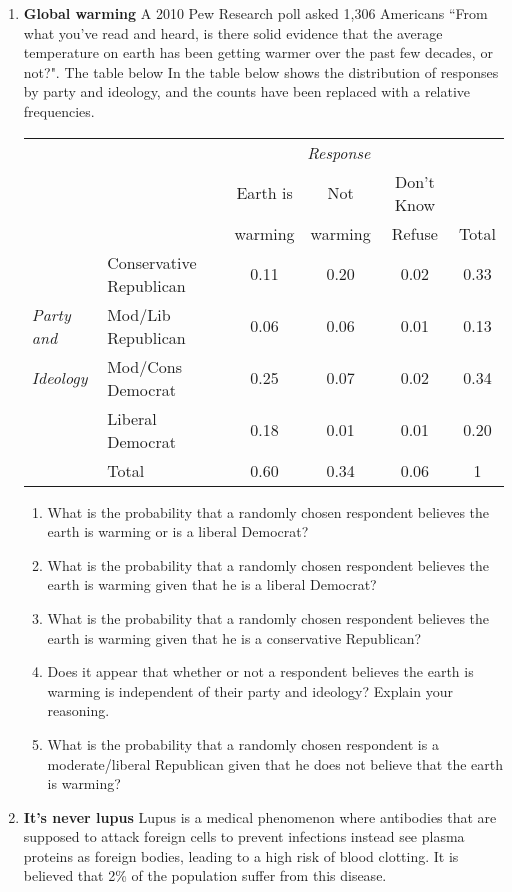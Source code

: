 \documentclass[10pt]{article}\usepackage[]{graphicx}\usepackage[]{color}
\begin{document}
\begin{enumerate}
\item \textbf{Global warming} A 2010 Pew Research poll asked 1,306 Americans ``From what you've read and heard, is there solid evidence that the average temperature on earth has been getting warmer over the past few decades, or not?". The table below In the table below shows the distribution of responses by party and ideology, and the counts have been replaced with a relative frequencies.
\begin{center}
\begin{tabular}{ll  ccc c} 
  						&			& \multicolumn{3}{c}{\textit{Response}} \\
\cline{3-5}
							&			& Earth is 		& Not 		& Don't Know	&	\\
							&			& warming	& warming 	& Refuse		& Total\\
\cline{2-6}
				& Conservative Republican	& 0.11	 	& 0.20		& 0.02 		& 0.33 	\\
\textit{Party and}	& Mod/Lib Republican		& 0.06	 	& 0.06 	 	& 0.01		& 0.13 \\
\textit{Ideology}		& Mod/Cons Democrat		& 0.25	 	& 0.07 	 	& 0.02 		& 0.34 \\
				& Liberal Democrat			& 0.18	 	& 0.01 	 	& 0.01 		& 0.20\\
\cline{2-6}
							&Total		& 0.60		& 0.34		& 0.06		& 1
\end{tabular}
\end{center}
\begin{enumerate}
  \itemsep0.25in
\item What is the probability that a randomly chosen respondent believes the earth is warming or is a liberal Democrat?
\item What is the probability that a randomly chosen respondent believes the earth is warming given that he is a liberal Democrat?
\item What is the probability that a randomly chosen respondent believes the earth is warming given that he is a conservative Republican?
\item Does it appear that whether or not a respondent believes the earth is warming is independent of their party and ideology? Explain your reasoning.
\item What is the probability that a randomly chosen respondent is a moderate/liberal Republican given that he does not believe that the earth is warming? 
\end{enumerate}



\item \textbf{It's never lupus} Lupus is a medical phenomenon where antibodies that are supposed to attack foreign cells to prevent infections instead see plasma proteins as foreign bodies, leading to a high risk of blood clotting. It is believed that 2\% of the population suffer from this disease. 


\end{enumerate}
\end{document}
